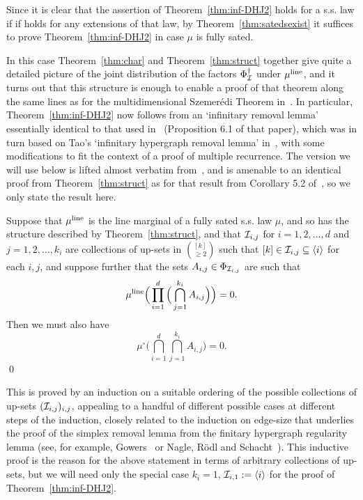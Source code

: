 \documentclass[11pt]{article}
\begin{document}
Since it is clear that the assertion of Theorem~\ref{thm:inf-DHJ2}
holds for a s.s. law if if holds for any extensions of that law, by
Theorem~\ref{thm:satedsexist} it suffices to prove
Theorem~\ref{thm:inf-DHJ2} in case $\mu$ is fully sated.

In this case Theorem~\ref{thm:char} and Theorem~\ref{thm:struct}
together give quite a detailed picture of the joint distribution of
the factors $\Phi^\dag_{\mathcal{I}}$ under $\mu^{\mathrm{line}}$, and it turns out that
this structure is enough to enable a proof of that theorem along the
same lines as for the multidimensional Szemer\'edi Theorem
in~\cite{Aus--newmultiSzem}. In particular,
Theorem~\ref{thm:inf-DHJ2} now follows from an `infinitary removal
lemma' essentially identical to that used
in~\cite{Aus--newmultiSzem} (Proposition 6.1 of that paper), which
was in turn based on Tao's `infinitary hypergraph removal lemma'
in~\cite{Tao07}, with some modifications to fit the context of a
proof of multiple recurrence. The version we will use below is
lifted almost verbatim from~\cite{Aus--newmultiSzem}, and is
amenable to an identical proof from Theorem~\ref{thm:struct} as for
that result from Corollary 5.2 of~\cite{Aus--newmultiSzem}, so we
only state the result here.

\begin{prop}\label{prop:removal}
Suppose that $\mu^{\mathrm{line}}$ is the line marginal of a fully sated s.s. law $\mu$,
and so has the structure described by Theorem~\ref{thm:struct}, and
that $\mathcal{I}_{i,j}$ for $i=1,2,\ldots,d$ and $j = 1,2,\ldots,k_i$ are
collections of up-sets in $\binom{[k]}{\geq 2}$ such that $[k] \in
\mathcal{I}_{i,j} \subseteq \langle i\rangle$ for each $i,j$, and suppose
further that the sets $A_{i,j}\in \Phi_{\mathcal{I}_{i,j}}$ are such that
\[\mu^{\mathrm{line}}\Big(\prod_{i=1}^d\Big(\bigcap_{j=1}^{k_i}A_{i,j}\Big)\Big) = 0.\]
Then we must also have
\[\mu^\circ\Big(\bigcap_{i=1}^d\bigcap_{j=1}^{k_i}A_{i,j}\Big) = 0.\]
\qed
\end{prop}

This is proved by an induction on a suitable ordering of the
possible collections of up-sets $(\mathcal{I}_{i,j})_{i,j}$, appealing to a
handful of different possible cases at different steps of the
induction, closely related to the induction on edge-size that
underlies the proof of the simplex removal lemma from the finitary
hypergraph regularity lemma (see, for example, Gowers~\cite{Gow06}
or Nagle, R\"odl and Schacht~\cite{NagRodSch07}).  This inductive
proof is the reason for the above statement in terms of arbitrary
collections of up-sets, but we will need only the special case
$k_i=1$, $\mathcal{I}_{i,1}:= \langle i\rangle$ for the proof of
Theorem~\ref{thm:inf-DHJ2}.
\end{document}
